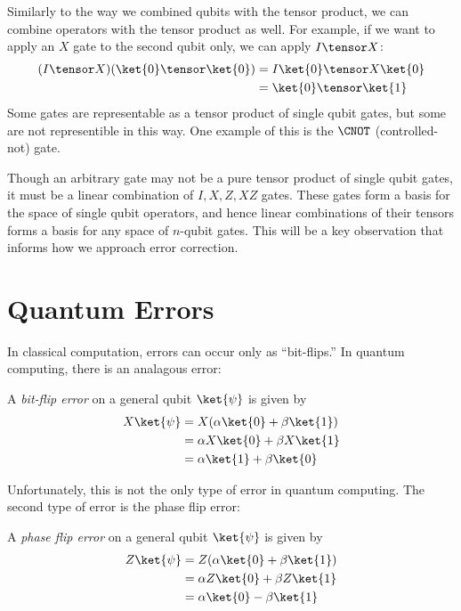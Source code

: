 \documentclass{article}
\begin{document}
        Similarly to the way we combined qubits with the tensor product, we can combine operators with the tensor product as well.
        For example, if we want to apply an $X$ gate to the second qubit only, we can apply $I \tensor X$:
        \begin{align*}
        (I \tensor X)(\ket{0} \tensor \ket{0}) &= I \ket{0} \tensor X \ket{0}\\
        &= \ket{0} \tensor \ket{1}
        \end{align*}
        Some gates are representable as a tensor product of single qubit gates, but some are not representible in this way.
        One example of this is the $\CNOT$ (controlled-not) gate.

        Though an arbitrary gate may not be a pure tensor product of single qubit gates, it must be a linear combination of $I, X, Z, XZ$ gates.
        These gates form a basis for the space of single qubit operators, and hence linear combinations of their tensors forms a basis for any space of $n$-qubit gates.
        This will be a key observation that informs how we approach error correction.

\section{Quantum Errors}

        In classical computation, errors can occur only as ``bit-flips.''
        In quantum computing, there is an analagous error:
        \begin{definition}
                A \textit{bit-flip error} on a general qubit $\ket{\psi}$ is given by
                \begin{align*}
                X \ket{\psi} &= X(\alpha \ket{0} + \beta \ket{1})\\
                &= \alpha X \ket{0} + \beta X \ket{1}\\
                &= \alpha \ket{1} + \beta \ket{0}
                \end{align*}
        \end{definition}

        Unfortunately, this is not the only type of error in quantum computing.
        The second type of error is the phase flip error:
        \begin{definition}
                A \textit{phase flip error} on a general qubit $\ket{\psi}$ is given by
                \begin{align*}
                Z \ket{\psi} &= Z(\alpha \ket{0} + \beta \ket{1})\\
                &= \alpha Z \ket{0} + \beta Z \ket{1}\\
                &= \alpha \ket{0} - \beta \ket{1}
                \end{align*}
        \end{definition}
\end{document}
